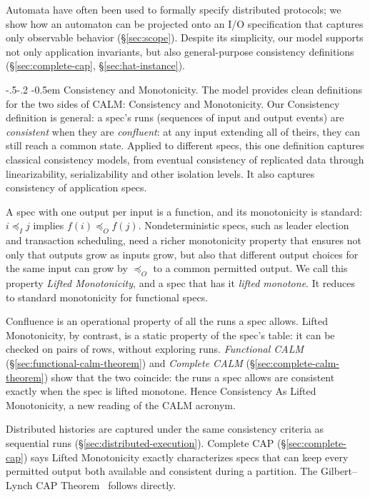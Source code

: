 \documentclass[sigconf]{cidr-2027}
\makeatletter
\theoremstyle{remark}
\renewcommand\paragraph{\@startsection{paragraph}{4}{\z@}%
  {-.5\baselineskip \@plus -2\p@ \@minus -.2\p@}%
  {-0.5em}%
  {\normalfont\bfseries}}
\newcommand{\InputOrd}{\preceq_I}
\newcommand{\OutputOrd}{\preceq_O}
\newcommand{\spectype}[1][]{I/O specification#1\xspace}
\makeatother
\begin{document}
Automata have often been used to formally specify distributed
protocols; we show how an automaton can be projected onto an \spectype[] that
captures only observable behavior (\S\ref{sec:scope}).
Despite its simplicity, our model supports not only application invariants, but also general-purpose consistency definitions (\S\ref{sec:complete-cap},
\S\ref{sec:hat-instance}).

\paragraph{Consistency and Monotonicity.}
The model provides clean definitions for the two sides of CALM: Consistency
and Monotonicity.  Our Consistency definition is general: a spec's runs
(sequences of input and output events) are \emph{consistent} when they are
\emph{confluent}: at any input extending all of theirs, they can still reach a
common state.  Applied to different specs,
this one definition captures classical consistency models, from eventual consistency of replicated data
through linearizability, serializability and other isolation levels.
It also captures consistency of application specs.

A spec with one output per input is a function, and its monotonicity is standard: $i\InputOrd j$
implies $f(i)\OutputOrd f(j)$.  Nondeterministic specs, such as leader election
and transaction scheduling, need a richer monotonicity property that ensures
not only that outputs grow as inputs grow, but also that different output
choices for the same input can grow by $\OutputOrd$ to a common permitted
output.  We call this property \emph{Lifted Monotonicity}, and a spec that has
it \emph{lifted monotone}.  It reduces to standard monotonicity for functional specs.

Confluence is an operational property of all the runs a spec allows.  Lifted Monotonicity,
by contrast, is a static property of the spec's table: it can be checked on
pairs of rows, without exploring runs.  \emph{Functional CALM}
(\S\ref{sec:functional-calm-theorem}) and \emph{Complete CALM}
(\S\ref{sec:complete-calm-theorem}) show that the two coincide: the runs a spec allows are consistent exactly when the spec is
lifted monotone.  Hence Consistency As Lifted Monotonicity, a new reading of the
CALM acronym.

Distributed histories are captured under the same consistency criteria as
sequential runs (\S\ref{sec:distributed-execution}).  Complete CAP
(\S\ref{sec:complete-cap}) says Lifted Monotonicity exactly characterizes specs
that can keep every permitted output both available and consistent during a
partition.  The Gilbert--Lynch CAP Theorem~\cite{gilbert2002cap} follows directly.
\end{document}
